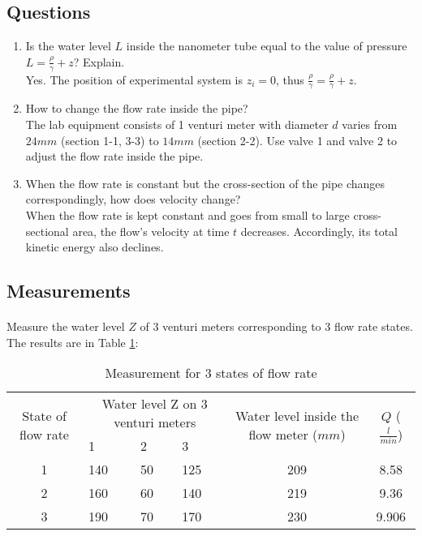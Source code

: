 \subsection{Questions}
\begin{enumerate}
	\item Is the water level $L$ inside the nanometer tube equal to the value of pressure $\displaystyle L=\frac{\rho}{\gamma}+z$? Explain.\\
	Yes. The position of experimental system is $z_i=0$, thus $\displaystyle \frac{\rho}{\gamma}=\frac{\rho}{\gamma}+z$.
	\item How to change the flow rate inside the pipe?\\
	The lab equipment consists of 1 venturi meter with diameter $d$ varies from $24mm$ (section 1-1, 3-3) to $14mm$ (section 2-2). Use valve 1 and valve 2 to adjust the flow rate inside the pipe.
	\item  When the flow rate is constant but the cross-section of the pipe changes correspondingly, how does velocity change?\\
	When the flow rate is kept constant and goes from small to large cross-sectional area, the flow's velocity at time $t$ decreases. Accordingly, its total kinetic energy also declines.
\end{enumerate}

\subsection{Measurements}
\paragraph{}
Measure the water level $Z$ of 3 venturi meters corresponding to 3 flow rate states. The results are in Table \ref{tab1lab3c}:
\begin{table}[ht]
	\centering
	\begin{tabular}{|c|p{1.5cm}|p{1.5cm}|p{1.5cm}|c|c|}
		\hline
		\multirow{2}{*}{State of flow rate} & \multicolumn{3}{c|}{Water level Z on 3 venturi meters} & \multirow{2}{100pt}{Water level inside the flow meter ($mm$)} & \multirow{2}{*}{$Q$ ($\frac{l}{min}$)} \\
		\cline{2-4}
		& 1 & 2 & 3 & & \\ \hline
		1 & 140 & 50 & 125 & 209 & 8.58 \\ \hline
		2 & 160 & 60 & 140 & 219 & 9.36 \\ \hline
		3 & 190 & 70 & 170 & 230 & 9.906 \\ \hline
	\end{tabular}
	\caption{Measurement for 3 states of flow rate}
	\label{tab1lab3c}
\end{table}

